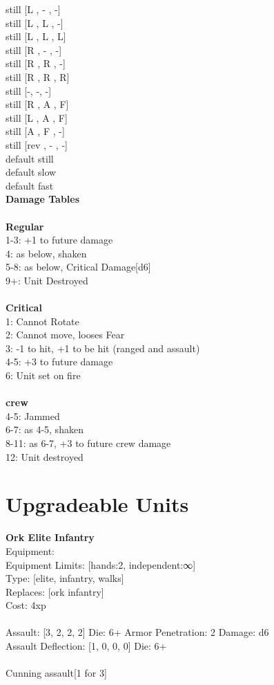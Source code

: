 still [L ,  - ,  -] \\
still [L ,  L ,  -] \\
still [L ,  L ,  L] \\
still [R ,  - ,  -] \\
still [R ,  R ,  -] \\
still [R ,  R ,  R] \\
still [-, -, -] \\
still [R ,  A ,  F] \\
still [L ,  A ,  F] \\
still [A ,  F ,  -] \\
still [rev ,  - ,  -] \\
default still \\
default slow \\
default fast \\


{\bf Damage Tables} \\
\ \\ {\bf Regular } \\
1-3: +1 to future damage \\
4: as below, shaken \\
5-8: as below, Critical Damage[d6] \\
9+: Unit Destroyed \\
\ \\ {\bf Critical } \\
1: Cannot Rotate \\
2: Cannot move, looses Fear \\
3: -1 to hit, +1 to be hit (ranged and assault) \\
4-5: +3 to future damage \\
6: Unit set on fire \\
\ \\ {\bf crew } \\
4-5: Jammed \\
6-7: as 4-5, shaken \\
8-11: as 6-7, +3 to future crew damage \\
12: Unit destroyed \\










\pagebreak\section{Upgradeable Units}{\bf Ork Elite Infantry } \\
Equipment:  \\
Equipment Limits: [hands:2, independent:∞] \\
Type: [elite, infantry, walks] \\
Replaces: [ork infantry] \\
Cost: 4xp\\
\ \\
Assault: [3, 2, 2, 2] Die: 6+ Armor Penetration: 2 Damage: d6 \\
Assault Deflection: [1, 0, 0, 0] Die: 6+\\
\\ 
Cunning assault[1 for 3]\\ 
 
